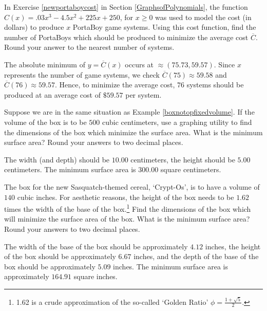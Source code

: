 \documentclass{ximera}
\begin{document}
\begin{question}
In Exercise \ref{newportaboycost} in Section \ref{GraphsofPolynomials},  the function $C(x) = .03x^{3} - 4.5x^{2} + 225x + 250$, for $x \geq 0$ was used to model the cost (in dollars) to produce $x$ PortaBoy game systems. Using this cost function, find the number of PortaBoys which should be produced to minimize the average cost $\overline{C}$.  Round your answer to the nearest number of systems.
\begin{solution}
The absolute minimum of $y=\overline{C}(x)$ occurs at $\approx (75.73, 59.57)$.  Since $x$ represents the number of game systems, we check $\overline{C}(75) \approx 59.58$ and $\overline{C}(76) \approx 59.57$.  Hence, to minimize the average cost, $76$ systems should be produced at an average cost of $\$59.57$ per system.
\end{solution}

\end{question}

\begin{question}
Suppose we are in the same situation as Example \ref{boxnotopfixedvolume}.  If the volume of the box is to be $500$ cubic centimeters, use a graphing utility to find the dimensions of the box which minimize the surface area.  What is the minimum surface area?  Round your answers to two decimal places.
\begin{solution}
The width (and depth) should be $10.00$ centimeters, the height should be $5.00$ centimeters.  The minimum surface area is $300.00$ square centimeters.
\end{solution}

\end{question}

\begin{question}
The box for the new Sasquatch-themed cereal, `Crypt-Os', is to have a volume of $140$ cubic inches.  For aesthetic reasons, the height of the box needs to be $1.62$ times the width of the base of the box.\footnote{1.62 is a crude approximation of the so-called `Golden Ratio' $\phi = \frac{1 + \sqrt{5}}{2}$.}  Find the dimensions of the box which will minimize the surface area of the box.  What is the minimum surface area?  Round your answers to two decimal places.
\begin{solution}
The width of the base of the box should be approximately $4.12$ inches, the height of the box should be approximately $ 6.67$ inches, and the depth of the base of the box should be approximately $5.09$ inches. The minimum surface area is approximately $164.91$ square inches.

\newpage
\end{solution}

\end{question}
\end{document}
